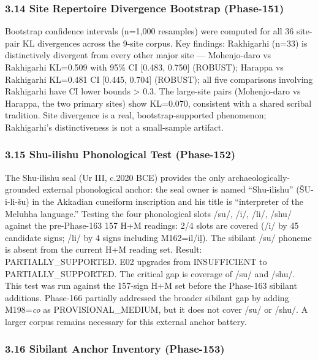 \documentclass[
]{article}
\begin{document}
\subsubsection{3.14 Site Repertoire Divergence Bootstrap
(Phase-151)}\label{site-repertoire-divergence-bootstrap-phase-151}

Bootstrap confidence intervals (n=1,000 resamples) were computed for all
36 site-pair KL divergences across the 9-site corpus. Key findings:
Rakhigarhi (n=33) is distinctively divergent from every other major site
--- Mohenjo-daro vs Rakhigarhi KL=0.509 with 95\% CI {[}0.483, 0.750{]}
(ROBUST); Harappa vs Rakhigarhi KL=0.481 CI {[}0.445, 0.704{]} (ROBUST);
all five comparisons involving Rakhigarhi have CI lower bounds
\textgreater{} 0.3. The large-site pairs (Mohenjo-daro vs Harappa, the
two primary sites) show KL=0.070, consistent with a shared scribal
tradition. Site divergence is a real, bootstrap-supported phenomenon;
Rakhigarhi's distinctiveness is not a small-sample artifact.

\subsubsection{3.15 Shu-ilishu Phonological Test
(Phase-152)}\label{shu-ilishu-phonological-test-phase-152}

The Shu-ilishu seal (Ur III, c.2020 BCE) provides the only
archaeologically-grounded external phonological anchor: the seal owner
is named ``Shu-ilishu'' (ŠU-i-li-šu) in the Akkadian cuneiform
inscription and his title is ``interpreter of the Meluhha language.''
Testing the four phonological slots /su/, /i/, /li/, /shu/ against the pre-Phase-163 157
H+M readings: 2/4 slots are covered (/i/ by 45 candidate signs; /li/ by
4 signs including M162=il/iḷ). The sibilant /su/ phoneme is absent from
the current H+M reading set. Result: PARTIALLY\_SUPPORTED. E02 upgrades
from INSUFFICIENT to PARTIALLY\_SUPPORTED. The critical gap is coverage
of /su/ and /shu/. This test was run against the 157-sign H+M set before the Phase-163 sibilant additions. Phase-166 partially addressed the broader sibilant gap by adding M198=\emph{co} as PROVISIONAL\_MEDIUM, but it does not cover /su/ or /shu/. A larger corpus remains necessary for this external anchor battery.

\subsubsection{3.16 Sibilant Anchor Inventory
(Phase-153)}\label{sibilant-anchor-inventory-phase-153}
\end{document}
